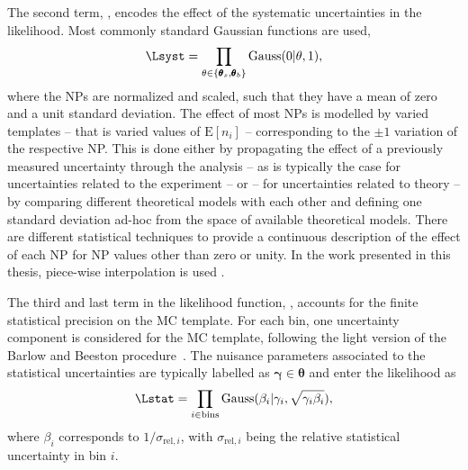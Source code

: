 The second term, \Lsyst, encodes the effect of the systematic uncertainties in the likelihood. Most commonly standard Gaussian functions are used,
\begin{equation}
    \Lsyst = \prod_{\theta \in \{ \pmb{\theta}_s,\pmb{\theta}_b \}} \text{Gauss}(0 | \theta, 1),
\end{equation}
where the NPs are normalized and scaled, such that they have a mean of zero and a unit standard deviation.
The effect of most NPs is modelled by varied templates -- that is varied values of $\text{E}[n_i]$ -- corresponding to the $\pm 1$ variation of the respective NP. This is done either by propagating the effect of a previously measured uncertainty through the analysis -- as is typically the case for uncertainties related to the experiment -- or -- for uncertainties related to theory -- by comparing different theoretical models with each other and defining one standard deviation ad-hoc from the space of available theoretical models.
There are different statistical techniques to provide a continuous description of the effect of each NP for NP values other than zero or unity.
In the work presented in this thesis, piece-wise interpolation is used .

The third and last term in the likelihood function, \Lstat, 
accounts for the finite statistical precision on the MC template. For each bin, one uncertainty component is considered for the MC template, following the light version of the Barlow and Beeston procedure~\cite{BARLOW1993219}. The nuisance parameters associated to the statistical uncertainties are typically labelled as $\pmb{\gamma} \in \pmb{\theta}$ and enter the likelihood as
\begin{equation}
    \Lstat = \prod_{i \in \text{bins}} \text{Gauss}(\beta_i | \gamma_i, \sqrt{\gamma_i \beta_i}),    
\end{equation}
where $\beta_i$ corresponds to $1 / \sigma_{\text{rel}, i}$, with $\sigma_{\text{rel}, i}$ being the relative statistical uncertainty in bin $i$. 


